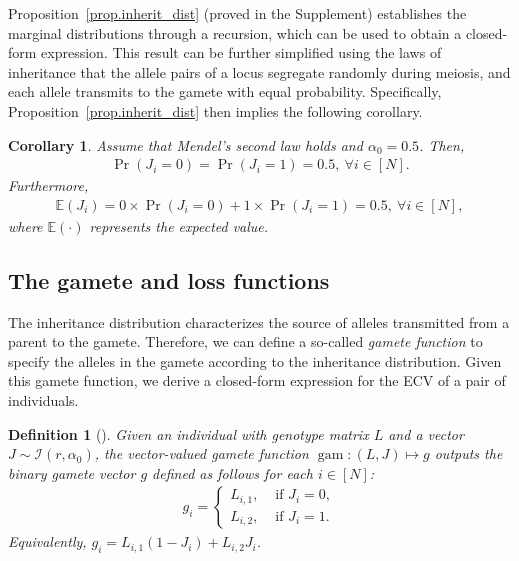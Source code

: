 \documentclass[12pt, a4paper, bibliography=totoc]{scrartcl}
\newtheorem{corollary}{Corollary}
\newtheorem{definition}{Definition}
\DeclareMathOperator*{\gam}{gam}
\newcommand{\Iscr}{\mathcal{I}}
\begin{document}
Proposition~\ref{prop.inherit_dist} (proved in the Supplement) establishes the marginal distributions through a recursion, which can be used to obtain a closed-form expression.  This result can be further simplified using the laws of inheritance that the allele pairs of a locus segregate randomly during meiosis, and each allele transmits to the gamete with equal probability. Specifically, Proposition~\ref{prop.inherit_dist} then implies the following corollary.
\begin{corollary} \label{Cor.mendel's}
 Assume that Mendel's second law holds and   $\alpha_0=0.5$. Then, 
\begin{align} \label{eq:P(Ji)reduced}
    \Pr(J_i=0)= \Pr(J_i=1)= 0.5, \ \forall i \in [N].
\end{align}
Furthermore, 
\begin{align} \label{eq:E(Ji)reduced}
    \mathbb{E}(J_i)= 0\times \Pr(J_i=0)+1\times \Pr(J_i=1)=0.5, \ \forall i \in [N],
\end{align}
where $\mathbb{E}(\cdot)$ represents the expected value.
\end{corollary}
\subsection*{The gamete and loss functions}\label{subsec:gamete}
The inheritance distribution characterizes the source of alleles transmitted from a parent to the gamete. Therefore, we can define a so-called \textit{gamete function} to specify the alleles in the gamete according to the inheritance distribution. Given this gamete function, we derive a closed-form expression for the ECV of a pair of individuals.  

\begin{definition} [\cite{han2017predicted}] \label{defn.gamete_func}
 Given an individual with genotype matrix $L$ and a vector $J\sim\Iscr(r,\alpha_0)$, the vector-valued gamete function $\gam:(L,J) \mapsto g$ outputs the binary gamete vector $g$  defined as follows for each $i\in [N]$:
	\begin{align} \label{eq:gamete_func1}
		g_i=
		\left\{
		\begin{array}{ll}
		L_{i,1}, & \text{ if }J_i = 0,\\
		L_{i,2}, & \text{ if }J_i = 1. 
		\end{array}
		\right.
	\end{align}
Equivalently,  $g_i = L_{i,1}(1-J_i)+L_{i,2}J_i$.
\end{definition}
\end{document}
